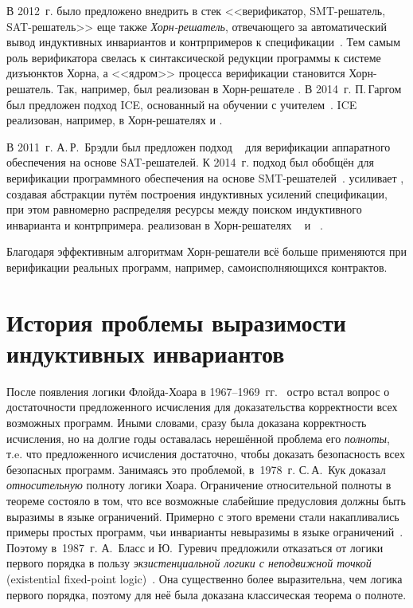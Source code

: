 В 2012~г. было предложено внедрить в стек <<верификатор, SMT-решатель, SAT-решатель>> еще также \emph{Хорн-решатель},  отвечающего за автоматический вывод индуктивных инвариантов и контрпримеров к спецификации~\cite{10.1145/2254064.2254112}.
Тем самым роль верификатора свелась  к синтаксической редукции программы к системе дизъюнктов Хорна, а <<ядром>> процесса верификации становится Хорн-решатель.
Так, например, \cegar{} был реализован в Хорн-решателе \eldarica{}.
В 2014~г. П.\,Гаргом был предложен подход ICE, основанный на обучении с учителем~\cite{10.1007/978-3-319-08867-9_5}.
ICE реализован, например, в Хорн-решателях \hoice{} и \rchc{}.

В 2011~г. А.\,Р.~Брэдли был предложен подход \pdr{}~\cite{10.1007/978-3-642-18275-4_7} для верификации аппаратного обеспечения на основе SAT-решателей.
К 2014~г. подход был обобщён для верификации программного обеспечения на основе SMT-решателей~\cite{10.1007/978-3-642-54862-8_4,10.1007/978-3-642-31612-8_13}.
\pdr{} усиливает \cegar{}, создавая абстракции путём построения индуктивных усилений спецификации, при этом равномерно распределяя ресурсы между поиском индуктивного инварианта и контрпримера.
\pdr{} реализован в Хорн-решателях \spacer{}~\cite{komuravelli2016smt} и \racer{}~\cite{10.1145/3498722}.

Благодаря эффективным алгоритмам Хорн-решатели всё больше применяются при верификации реальных программ, например, самоисполняющихся контрактов.

\section{История проблемы выразимости индуктивных инвариантов}\label{sec:background/historyExpressivity}
После появления логики Флойда-Хоара в \numrange{1967}{1969}~гг.~\cite{Floyd1993,10.1145/363235.363259} остро встал вопрос о достаточности предложенного исчисления для доказательства корректности всех возможных программ.
Иными словами, сразу была доказана корректность исчисления, но на долгие годы оставалась нерешённой проблема его \emph{полноты}, т.\:e. что предложенного исчисления достаточно, чтобы доказать безопасность всех безопасных программ.
Занимаясь это проблемой, в~1978~г. С.\,А.~Кук доказал~\cite{doi:10.1137/0207005} \emph{относительную} полноту логики Хоара.
Ограничение относительной полноты в теореме состояло в том, что все возможные слабейшие предусловия должны быть выразимы в языке ограничений.
Примерно с этого времени стали накапливались примеры простых программ, чьи инварианты невыразимы в языке ограничений~\cite{10.1145/371282.371285}.
Поэтому в~1987~г. А.~Бласс и Ю.~Гуревич предложили отказаться от логики первого порядка в пользу \emph{экзистенциальной логики с неподвижной точкой} (existential fixed-point logic)~\cite{Blass1987,blass2000the}. Она существенно более выразительна, чем логика первого порядка, поэтому для неё была доказана классическая теорема о полноте.


